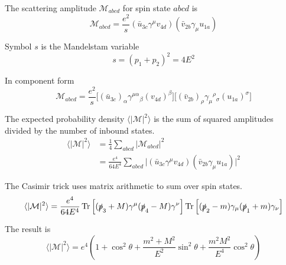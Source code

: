 The scattering amplitude $\mathcal M_{abcd}$ for spin state $abcd$ is
\begin{equation*}
\mathcal{M}_{abcd}=\frac{e^2}{s}(\bar{u}_{3c}\gamma^\mu v_{4d})(\bar{v}_{2b}\gamma_\mu u_{1a})
\end{equation*}

Symbol $s$ is the Mandelstam variable
\begin{equation*}
s=(p_1+p_2)^2=4E^2
\end{equation*}

In component form
\begin{equation*}
\mathcal{M}_{abcd}=\frac{e^2}{s}
\bigl[
(\bar{u}_{3c})_\alpha\gamma^{\mu\alpha}{}_\beta(v_{4d})^\beta
\bigr]
\bigl[
(\bar{v}_{2b})_\rho\gamma_\mu{}^\rho{}_\sigma(u_{1a})^\sigma
\bigr]
\end{equation*}

The expected probability density $\langle|\mathcal{M}|^2\rangle$
is the sum of squared amplitudes divided by the number of inbound states.
\begin{align*}
\langle|\mathcal{M}|^2\rangle
&=\frac{1}{4}\sum_{abcd}\big|\mathcal{M}_{abcd}\big|^2
\\
&=\frac{e^4}{64E^4}\sum_{abcd}
\bigl|(\bar{u}_{3c}\gamma^\mu v_{4d})(\bar{v}_{2b}\gamma_\mu u_{1a})\bigr|^2
\end{align*}

The Casimir trick uses matrix arithmetic to sum over spin states.
\begin{equation*}
\langle|\mathcal{M}|^2\rangle
=\frac{e^4}{64E^4}
\operatorname{Tr}\left[(\slashed{p}_3+M)\gamma^\mu(\slashed{p}_4-M)\gamma^\nu\right]
\operatorname{Tr}\left[(\slashed{p}_2-m)\gamma_\mu(\slashed{p}_1+m)\gamma_\nu\right]
\end{equation*}

\iffalse

Another way to compute $\langle|\mathcal{M}|^2\rangle$ is
\begin{equation*}
\langle|\mathcal{M}|^2\rangle
=\frac{e^4}{4s^2}
\left(-8 s^2 + 16 t^2 - 16 s u + (64 s + 32 u) \left(m^2 + M^2\right) - 48 \left(m^2 + M^2\right)^2\right)
\end{equation*}
where
\begin{align*}
s&=(p_1+p_2)^2
\\
t&=(p_1-p_3)^2
\\
u&=(p_1-p_4)^2
\end{align*}

\fi

The result is
\begin{equation*}
\langle|\mathcal{M}|^2\rangle
=e^4\left(1+\cos^2\theta+\frac{m^2+M^2}{E^2}\sin^2\theta+\frac{m^2M^2}{E^4}\cos^2\theta\right)
\end{equation*}

